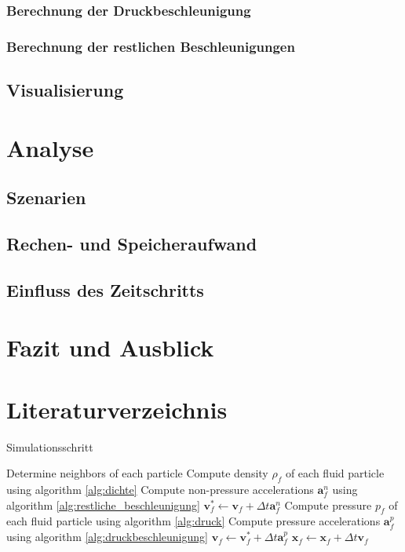 \documentclass{scrreprt}
\begin{document}
\subsection{Berechnung der Druckbeschleunigung}
\subsection{Berechnung der restlichen Beschleunigungen}
\section{Visualisierung}
\chapter{Analyse}
\section{Szenarien}
\section{Rechen- und Speicheraufwand}
\section{Einfluss des Zeitschritts}
\section{}
\chapter{Fazit und Ausblick}
\chapter{Literaturverzeichnis}

\begin{algorithm}
\caption{Simulationsschritt}
\label{alg:simulationsschritt}
\begin{algorithmic}[1]
    \STATE Determine neighbors of each particle
    \STATE Compute density $\rho_f$ of each fluid particle using algorithm \ref{alg:dichte}
    \STATE Compute non-pressure accelerations $\textbf{a}_f^n$ using algorithm \ref{alg:restliche_beschleunigung}
        \STATE $\textbf{v}_f^* \gets \textbf{v}_f + \Delta t \textbf{a}_f^n$
    \ENDFOR
    \STATE Compute pressure $p_f$ of each fluid particle using algorithm \ref{alg:druck}
    \STATE Compute pressure accelerations $\textbf{a}_f^p$ using algorithm \ref{alg:druckbeschleunigung}
        \STATE $\textbf{v}_f \gets \textbf{v}_f^* + \Delta t \textbf{a}_f^p$
    \ENDFOR
        \STATE $\textbf{x}_f \gets \textbf{x}_f + \Delta t \textbf{v}_f$
    \ENDFOR
    \STATE 
\end{algorithmic}
\end{algorithm}
\end{document}

